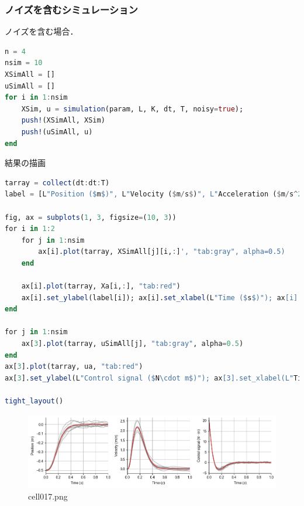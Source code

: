 \subsubsection{ノイズを含むシミュレーション}
ノイズを含む場合．
\begin{lstlisting}[language=julia]
n = 4
nsim = 10
XSimAll = []
uSimAll = []
for i in 1:nsim
    XSim, u = simulation(param, L, K, dt, T, noisy=true);
    push!(XSimAll, XSim)
    push!(uSimAll, u)
end
\end{lstlisting}
結果の描画
\begin{lstlisting}[language=julia]
tarray = collect(dt:dt:T)
label = [L"Position ($m$)", L"Velocity ($m/s$)", L"Acceleration ($m/s^2$)", L"Jerk ($m/s^3$)"]

fig, ax = subplots(1, 3, figsize=(10, 3))
for i in 1:2
    for j in 1:nsim
        ax[i].plot(tarray, XSimAll[j][i,:]', "tab:gray", alpha=0.5)
    end
    
    ax[i].plot(tarray, Xa[i,:], "tab:red")
    ax[i].set_ylabel(label[i]); ax[i].set_xlabel(L"Time ($s$)"); ax[i].set_xlim(0, T); ax[i].grid()
end

for j in 1:nsim
    ax[3].plot(tarray, uSimAll[j], "tab:gray", alpha=0.5)
end
ax[3].plot(tarray, ua, "tab:red")
ax[3].set_ylabel(L"Control signal ($N\cdot m$)"); ax[3].set_xlabel(L"Time ($s$)"); ax[3].set_xlim(0, T); ax[3].grid()

tight_layout()
\end{lstlisting}
\begin{figure}[ht]
	\centering
	\includegraphics[scale=0.8, max width=\linewidth]{./fig/motor-learning/infinite-horizon-ofc/cell017.png}
	\caption{cell017.png}
	\label{cell017.png}
\end{figure}
